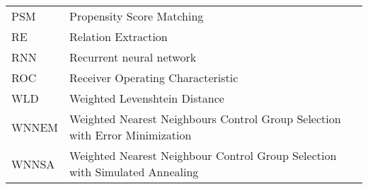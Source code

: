 \begin{tabular}{lp{10cm}}
	PSM     & Propensity Score Matching                                                   \\
	RE      & Relation Extraction                                                         \\
	RNN     & Recurrent neural network                                                    \\
	ROC     & Receiver Operating Characteristic                                           \\
	WLD     & Weighted Levenshtein Distance                                               \\
	WNNEM   & Weighted Nearest Neighbours Control Group Selection with Error Minimization \\
	WNNSA   & Weighted Nearest Neighbour Control Group Selection with Simulated Annealing \\ 
\end{tabular}
